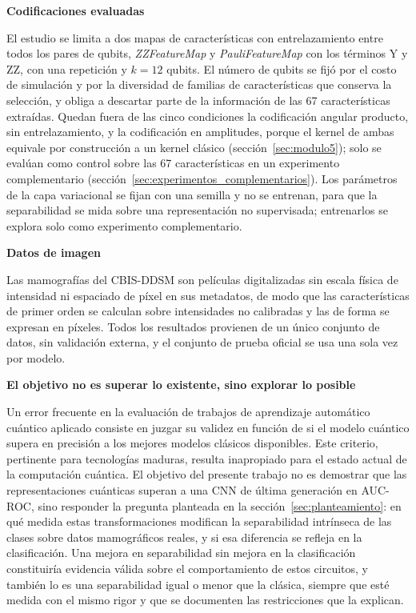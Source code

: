 \textbf{Codificaciones evaluadas}

El estudio se limita a dos mapas de características con entrelazamiento entre todos los pares de
qubits, \textit{ZZFeatureMap} y \textit{PauliFeatureMap} con los términos Y y ZZ, con una repetición
y $k = 12$ qubits. El número de qubits se fijó por el costo de simulación y por la diversidad de
familias de características que conserva la selección, y obliga a descartar parte de la información
de las 67 características extraídas. Quedan fuera de las cinco condiciones la codificación angular producto, sin entrelazamiento, y la
codificación en amplitudes, porque el kernel de ambas equivale por construcción a un kernel clásico
(sección~\ref{sec:modulo5}); solo se evalúan como control sobre las 67 características en un
experimento complementario (sección~\ref{sec:experimentos_complementarios}). Los parámetros de la capa variacional se fijan con una semilla
y no se entrenan, para que la separabilidad se mida sobre una representación no supervisada;
entrenarlos se explora solo como experimento complementario.

\textbf{Datos de imagen}

Las mamografías del CBIS-DDSM son películas digitalizadas sin escala física de intensidad ni
espaciado de píxel en sus metadatos, de modo que las características de primer orden se calculan
sobre intensidades no calibradas y las de forma se expresan en píxeles. Todos los resultados
provienen de un único conjunto de datos, sin validación externa, y el conjunto de prueba oficial se
usa una sola vez por modelo.

\textbf{El objetivo no es superar lo existente, sino explorar lo posible}

Un error frecuente en la evaluación de trabajos de aprendizaje automático cuántico aplicado consiste
en juzgar su validez en función de si el modelo cuántico supera en precisión a los mejores modelos
clásicos disponibles. Este criterio, pertinente para tecnologías maduras, resulta inapropiado para el
estado actual de la computación cuántica. El objetivo del presente trabajo no es demostrar que las
representaciones cuánticas superan a una CNN de última generación en AUC-ROC, sino responder la
pregunta planteada en la sección~\ref{sec:planteamiento}: en qué medida estas transformaciones
modifican la separabilidad intrínseca de las clases sobre datos mamográficos reales, y si esa
diferencia se refleja en la clasificación. Una mejora en separabilidad sin mejora en la clasificación
constituiría evidencia válida sobre el comportamiento de estos circuitos, y también lo es una
separabilidad igual o menor que la clásica, siempre que esté medida con el mismo rigor y que se
documenten las restricciones que la explican.
